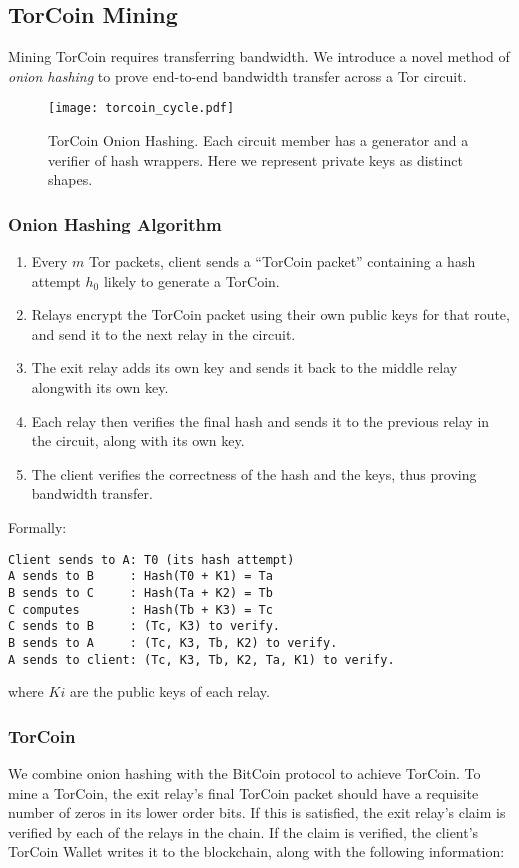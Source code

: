 \subsection{TorCoin Mining}

Mining TorCoin requires transferring bandwidth. We introduce a novel method of 
\textit{onion hashing} to prove end-to-end bandwidth transfer across a Tor circuit.

\begin{figure}[H]
  \centering
    \texttt{[image: torcoin\_cycle.pdf]}
  \caption{TorCoin Onion Hashing. Each circuit member has a generator and a 
  verifier of hash wrappers. Here we represent private keys as distinct shapes.}
\end{figure}

\subsubsection{Onion Hashing Algorithm}
\begin{enumerate}
\item Every $m$ Tor packets, client sends a ``TorCoin packet'' containing a hash
attempt $h_0$ likely to generate a TorCoin.
\item Relays encrypt the TorCoin packet using their own public keys for that route, 
and send it to the next relay in the circuit.
\item The exit relay adds its own key and sends it back to the middle relay 
alongwith its own key.
\item Each relay then verifies the final hash and sends it to the previous relay 
in the circuit, along with its own key.
\item The client verifies the correctness of the hash and the keys, thus proving
bandwidth transfer.
\end{enumerate}

Formally:

\begin{verbatim}
Client sends to A: T0 (its hash attempt)
A sends to B     : Hash(T0 + K1) = Ta
B sends to C     : Hash(Ta + K2) = Tb
C computes       : Hash(Tb + K3) = Tc
C sends to B     : (Tc, K3) to verify.
B sends to A     : (Tc, K3, Tb, K2) to verify.
A sends to client: (Tc, K3, Tb, K2, Ta, K1) to verify.
\end{verbatim}
where $Ki$ are the public keys of each relay.

\subsubsection{TorCoin}
We combine onion hashing with the BitCoin protocol to achieve TorCoin. 
To mine a TorCoin, the exit relay's final TorCoin packet should have a requisite
number of zeros in its lower order bits. If this is satisfied, the exit relay's
claim is verified by each of the relays in the chain.
If the claim is verified, the client's TorCoin Wallet writes it to the blockchain,
along with the following information:

